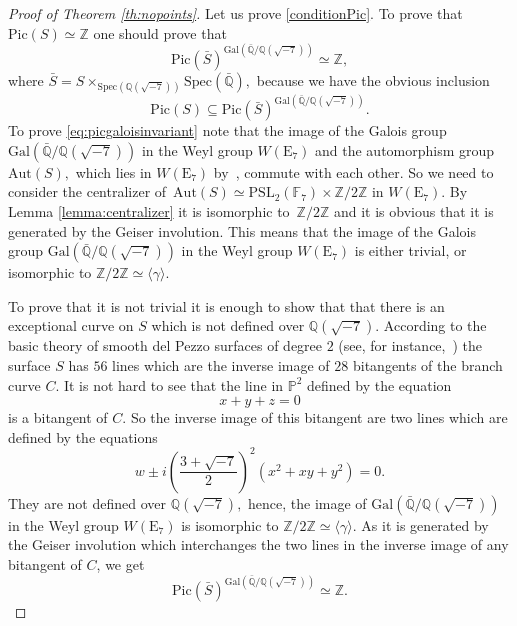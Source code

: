 \documentclass[10pt,a4paper]{amsart}
\begin{document}
\begin{proof}[Proof of Theorem \ref{th:nopoints}]
Let us prove \ref{conditionPic}. To prove that $\mathrm{Pic}(S) \simeq \mathbb{Z}$ one should prove that  
\begin{equation}\label{eq:picgaloisinvariant}
\mathrm{Pic}(\bar{S})^{\mathrm{Gal}(\bar{\mathbb{Q}}/\mathbb{Q}(\sqrt{-7}))} \simeq \mathbb{Z},
\end{equation}
\noindent where $\bar{S}=S \times_{\mathrm{Spec}(\mathbb{Q}(\sqrt{-7}))}\mathrm{Spec}(\bar{\mathbb{Q}}),$ because we have the obvious inclusion 
$$
\mathrm{Pic}(S) \subseteq \mathrm{Pic}(\bar{S})^{\mathrm{Gal}(\bar{\mathbb{Q}}/\mathbb{Q}(\sqrt{-7}))}.
$$
\noindent To prove \eqref{eq:picgaloisinvariant} note that the image of the Galois group $\mathrm{Gal}(\bar{\mathbb{Q}}/\mathbb{Q}(\sqrt{-7}))$ in the Weyl group $W(\mathrm{E}_7)$ and the automorphism group $\mathrm{Aut}(S),$ which lies in $W(\mathrm{E}_7)$ by~\cite[Corollary 8.2.40]{Dolgachev}, commute with each other. So we need to consider the centralizer of~\mbox{$\mathrm{Aut}(S) \simeq \mathrm{PSL}_2(\mathbb{F}_7) \times \mathbb{Z}/2\mathbb{Z}$} in $W(\mathrm{E}_7).$ By Lemma \ref{lemma:centralizer} it is isomorphic to~$\mathbb{Z}/2\mathbb{Z}$ and it is obvious that it is generated by the Geiser involution. This means that the image of the Galois group $\mathrm{Gal}(\bar{\mathbb{Q}}/\mathbb{Q}(\sqrt{-7}))$ in the Weyl group $W(\mathrm{E}_7)$ is either trivial, or isomorphic to $\mathbb{Z}/2\mathbb{Z} \simeq \langle \gamma \rangle.$ 

To prove that it is not trivial it is enough to show that that there is an exceptional curve on $S$ which is not defined over $\mathbb{Q}(\sqrt{-7}).$ According to the basic theory of smooth del Pezzo surfaces of degree $2$ (see, for instance,~\cite[\S 8.7.1]{Dolgachev}) the surface $S$ has $56$ lines which are the inverse image of $28$ bitangents of the branch curve $C.$ It is not hard to see that the line in $\mathbb{P}^2$ defined by the equation
$$
x+y+z=0
$$
is a bitangent of $C.$ So the inverse image of this bitangent are two lines which are defined by the equations
$$
w \pm i\left(\frac{3+\sqrt{-7}}{2} \right)^2(x^2+xy+y^2)=0.
$$
\noindent They are not defined over $\mathbb{Q}(\sqrt{-7}),$ hence, the image of  $\mathrm{Gal}(\bar{\mathbb{Q}}/\mathbb{Q}(\sqrt{-7}))$ in the Weyl group $W(\mathrm{E}_7)$ is isomorphic to $\mathbb{Z}/2\mathbb{Z} \simeq \langle \gamma \rangle.$ As it is generated by the Geiser involution which  interchanges the two lines in the inverse image of
any bitangent of $C$, we get
$$ 
\mathrm{Pic}(\bar{S})^{\mathrm{Gal}(\bar{\mathbb{Q}}/\mathbb{Q}(\sqrt{-7}))} \simeq \mathbb{Z}.
$$








\end{proof}
\end{document}
